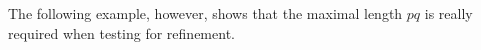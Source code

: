\documentclass[3p,times]{elsarticle}
\newcommand{\xbox}{\unskip\nobreak\hfil\penalty50
      \hskip2em\hbox{}\nobreak\hfil$\Box$%
      \parfillskip=0pt\finalhyphendemerits=0 \par%

      \medskip
      \parfillskip=0pt plus 1fil
}
\newcommand{\epass}{{\text{\it pass}}}
\newcounter{examplectr}
\newenvironment{example}[1][]
{\refstepcounter{examplectr}

\medskip
\noindent
{\bf Example~\theexamplectr.}}     %
{
}
\begin{document}
The following example, however, shows that the maximal length $pq$ is really
required when testing for refinement.
%
%
%
\end{document}
